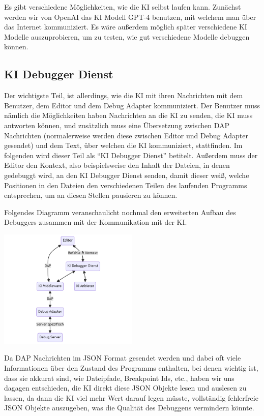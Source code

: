 \documentclass[a4paper,12pt,ngerman]{scrartcl}
\begin{document}
Es gibt verschiedene Möglichkeiten, wie die KI selbst laufen kann. Zunächst werden wir von OpenAI das KI Modell GPT-4 benutzen, mit welchem man über das Internet kommuniziert. Es wäre außerdem möglich später verschiedene KI Modelle auszuprobieren, um zu testen, wie gut verschiedene Modelle debuggen können.

\subsection{KI Debugger Dienst}

Der wichtigste Teil, ist allerdings, wie die KI mit ihren Nachrichten mit dem Benutzer, dem Editor und dem Debug Adapter kommuniziert. Der Benutzer muss nämlich die Möglichkeiten haben Nachrichten an die KI zu senden, die KI muss antworten können, und zusätzlich muss eine Übersetzung zwischen DAP Nachrichten (normalerweise werden diese zwischen Editor und Debug Adapter gesendet) und dem Text, über welchen die KI kommuniziert, stattfinden. Im folgenden wird dieser Teil als ``KI Debugger Dienst'' betitelt. Außerdem muss der Editor den Kontext, also beispielsweise den Inhalt der Dateien, in denen gedebuggt wird, an den KI Debugger Dienst senden, damit dieser weiß, welche Positionen in den Dateien den verschiedenen Teilen des laufenden Programms entsprechen, um an diesen Stellen pausieren zu können.

Folgendes Diagramm veranschaulicht nochmal den erweiterten Aufbau des Debuggers zusammen mit der Kommunikation mit der KI.

\begin{center}	
	\includegraphics[width=0.5\textwidth]{ai_integration}
\end{center}

Da DAP Nachrichten im JSON Format gesendet werden und dabei oft viele Informationen über den Zustand des Programms enthalten, bei denen wichtig ist, dass sie akkurat sind, wie Dateipfade, Breakpoint Ids, etc., haben wir uns dagagen entschieden, die KI direkt diese JSON Objekte lesen und auslesen zu lassen, da dann die KI viel mehr Wert darauf legen müsste, vollständig fehlerfreie JSON Objekte auszugeben, was die Qualität des Debuggens vermindern könnte.
\end{document}
